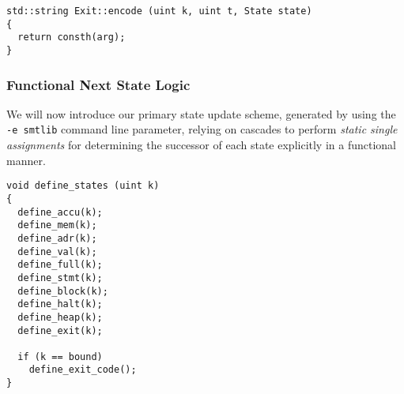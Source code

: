 


\begin{lstlisting}[style=c++, style=encode]
std::string Exit::encode (uint k, uint t, State state)
{
  return consth(arg);
}
\end{lstlisting}

\subsubsection*{Functional Next State Logic}


\noindent
We will now introduce our primary state update scheme, generated by using the \texttt{-e smtlib} command line parameter,
relying on  cascades to perform \emph{static single assignments} for determining the successor of each state explicitly in a functional manner.%


\begin{lstlisting}[style=c++]
void define_states (uint k)
{
  define_accu(k);
  define_mem(k);
  define_adr(k);
  define_val(k);
  define_full(k);
  define_stmt(k);
  define_block(k);
  define_halt(k);
  define_heap(k);
  define_exit(k);

  if (k == bound)
    define_exit_code();
}
\end{lstlisting}

